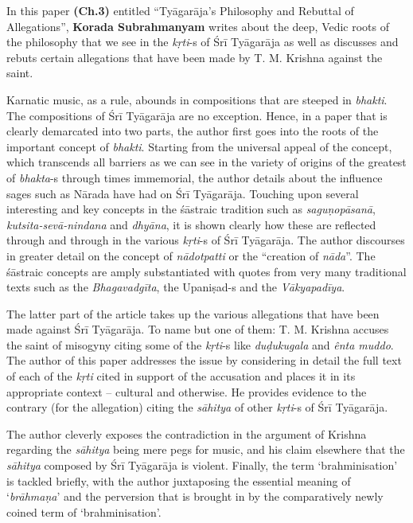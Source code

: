 In this paper \textbf{(Ch.3)} entitled “Tyāgarāja’s Philosophy and Rebuttal of Allegations”, \textbf{Korada Subrahmanyam} writes about the deep, Vedic roots of the philosophy that we see in the \textit{kṛti}-s of Śrī Tyāgarāja as well as discusses and rebuts certain allegations that have been made by T. M. Krishna against the saint.

Karnatic music, as a rule, abounds in compositions that are steeped in \textit{bhakti}. The compositions of Śrī Tyāgarāja are no exception. Hence, in a paper that is clearly demarcated into two parts, the author first goes into the roots of the important concept of \textit{bhakti}. Starting from the universal appeal of the concept, which transcends all barriers as we can see in the variety of origins of the greatest of \textit{bhakta}-s through times immemorial, the author details about the influence sages such as Nārada have had on Śrī Tyāgarāja. Touching upon several interesting and key concepts in the śāstraic tradition such as \textit{saguṇopāsanā}, \textit{kutsita-sevā-nindana} and \textit{dhyāna}, it is shown clearly how these are reflected through and through in the various \textit{kṛti}-s of Śrī Tyāgarāja. The author discourses in greater detail on the concept of \textit{nādotpatti} or the “creation of \textit{nāda}”. The śāstraic concepts are amply substantiated with quotes from very many traditional texts such as the \textit{Bhagavadgīta}, the Upaniṣad-s and the \textit{Vākyapadīya}.

The latter part of the article takes up the various allegations that have been made against Śrī Tyāgarāja. To name but one of them: T. M. Krishna accuses the saint of misogyny citing some of the \textit{kṛti}-s like \textit{duḍukugala} and \textit{ênta muddo}. The author of this paper addresses the issue by considering in detail the full text of each of the \textit{kṛti} cited in support of the accusation and places it in its appropriate context – cultural and otherwise. He provides evidence to the contrary (for the allegation) citing the \textit{sāhitya} of other \textit{kṛti}-s of Śrī Tyāgarāja.

The author cleverly exposes the contradiction in the argument of Krishna regarding the \textit{sāhitya} being mere pegs for music, and his claim elsewhere that the \textit{sāhitya} composed by Śrī Tyāgarāja is violent. Finally, the term ‘brahminisation’ is tackled briefly, with the author juxtaposing the essential meaning of ‘\textit{brāhmaṇa}’ and the perversion that is brought in by the comparatively newly coined term of ‘brahminisation’.

